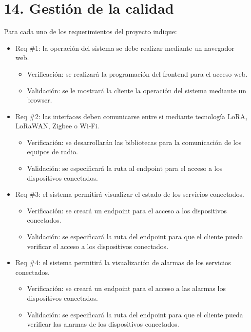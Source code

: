 \documentclass[
11pt%
]{charter}
\begin{document}
\section{14. Gestión de la calidad}
\label{sec:calidad}


Para cada uno de los requerimientos del proyecto indique:
\begin{itemize} 
\item Req \#1: la operación del sistema se debe realizar mediante un navegador web.

\begin{itemize}
	\item Verificación: se realizará la programación del frontend para el acceso web.  
	\item Validación: se le mostrará la cliente la operación del sistema mediante un browser.
\end{itemize}

\item Req \#2: las interfaces deben comunicarse entre si mediante tecnología LoRA, LoRaWAN, Zigbee o Wi-Fi.

\begin{itemize}
	\item Verificación: se desarrollarán las bibliotecas para la comunicación de los equipos de radio.  
	\item Validación: se especificará la ruta al endpoint para el acceso a los dispositivos conectados.
\end{itemize}

\item Req \#3: el sistema permitirá visualizar el estado de los servicios conectados.

\begin{itemize}
	\item Verificación: se creará un endpoint para el acceso a los dispositivos conectados.  
	\item Validación: se especificará la ruta del endpoint para que el cliente pueda verificar el acceso a los dispositivos conectados.
\end{itemize}

\item Req \#4: el sistema permitirá la visualización de alarmas de los servicios conectados.

\begin{itemize}
	\item Verificación: se creará un endpoint para el acceso a las alarmas los dispositivos conectados.  
	\item Validación: se especificará la ruta del endpoint para que el cliente pueda verificar las alarmas de los dispositivos conectados.
\end{itemize}


\end{itemize}
\end{document}
